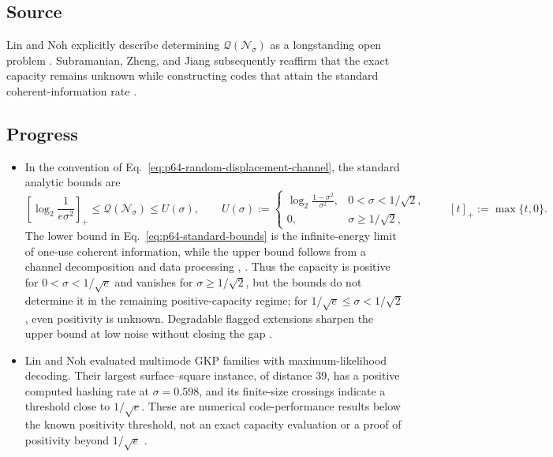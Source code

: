 \subsection*{Source}

Lin and Noh explicitly describe determining
$\mathcal Q(\mathcal N_\sigma)$ as a longstanding open problem
.  Subramanian, Zheng, and Jiang subsequently
reaffirm that the exact capacity remains unknown while constructing codes
that attain the standard coherent-information rate
.

\subsection*{Progress}

\begin{itemize}
  \item In the convention of
  Eq.~\eqref{eq:p64-random-displacement-channel}, the standard analytic bounds
  are
  \begin{equation}
    \left[\log_2\!\frac{1}{e\sigma^2}\right]_+
    \leq \mathcal Q(\mathcal N_\sigma)
    \leq U(\sigma),
    \qquad
    U(\sigma):=
    \begin{cases}
      \displaystyle\log_2\!\frac{1-\sigma^2}{\sigma^2},
        &0<\sigma<1/\sqrt2,\\[1mm]
      0,&\sigma\geq1/\sqrt2,
    \end{cases}
    \qquad [t]_+:=\max\{t,0\}.
    \label{eq:p64-standard-bounds}
  \end{equation}
  The lower bound in Eq.~\eqref{eq:p64-standard-bounds} is the infinite-energy
  limit of one-use coherent information, while the upper bound follows from a
  channel decomposition and data processing
  ,
  .  Thus the capacity is positive
  for $0<\sigma<1/\sqrt e$ and vanishes for
  $\sigma\geq1/\sqrt2$, but the bounds do not determine it in the remaining
  positive-capacity regime; for
  $1/\sqrt e\leq\sigma<1/\sqrt2$, even positivity is unknown.  Degradable
  flagged extensions sharpen the upper bound at low noise without closing the
  gap .

  \item Lin and Noh evaluated multimode GKP families with maximum-likelihood
  decoding.  Their largest surface--square instance, of distance $39$, has a
  positive computed hashing rate at $\sigma=0.598$, and its finite-size
  crossings indicate a threshold close to $1/\sqrt e$.  These are numerical
  code-performance results below the known positivity threshold, not an exact
  capacity evaluation or a proof of positivity beyond $1/\sqrt e$
  .


\end{itemize}
